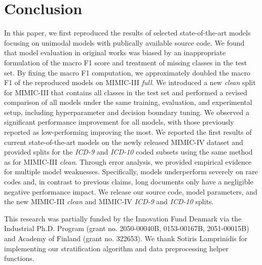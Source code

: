 \documentclass[anonymous=false, sigconf=true, review=false, natbib=true]{acmart}
\begin{document}
\section{Conclusion}
In this paper, we first reproduced the results of selected state-of-the-art models focusing on unimodal models with publically available source code. 
We found that model evaluation in original works was biased by an inappropriate formulation of the macro F1 score and treatment of missing classes in the test set. By fixing the macro F1 computation, we approximately doubled the macro F1 of the reproduced models on MIMIC-III \textit{full}. 
We introduced a new \textit{clean} split for MIMIC-III that contains all classes in the test set and performed a revised comparison of all models under the same training, evaluation, and experimental setup, including hyperparameter and decision boundary tuning. We observed a significant performance improvement for all models, with those previously reported as low-performing improving the most. 
We reported the first results of current state-of-the-art models on the newly released MIMIC-IV dataset \cite{johnsonMIMICIVFreelyAccessible2023, goldbergerPhysioBankPhysioToolkitPhysioNet2000} and provided splits for the \textit{ICD-9} and \textit{ICD-10} coded subsets using the same method as for MIMIC-III \textit{clean}.
Through error analysis, we provided empirical evidence for multiple model weaknesses. Specifically, models underperform severely on rare codes 
and, in contrast to previous claims, long documents only have a negligible negative performance impact. 
We release our source code, model parameters, and the new MIMIC-III \textit{clean} and MIMIC-IV \textit{ICD-9} and \textit{ICD-10} splits.






\begin{acks}
 This research was partially funded by the Innovation Fund Denmark via the Industrial Ph.D. Program (grant no. 2050-00040B, 0153-00167B, 2051-00015B) and Academy of Finland (grant no. 322653).
 We thank Sotiris Lamprinidis for implementing our stratification algorithm and data preprocessing helper functions.
\end{acks}





\appendix
\end{document}
